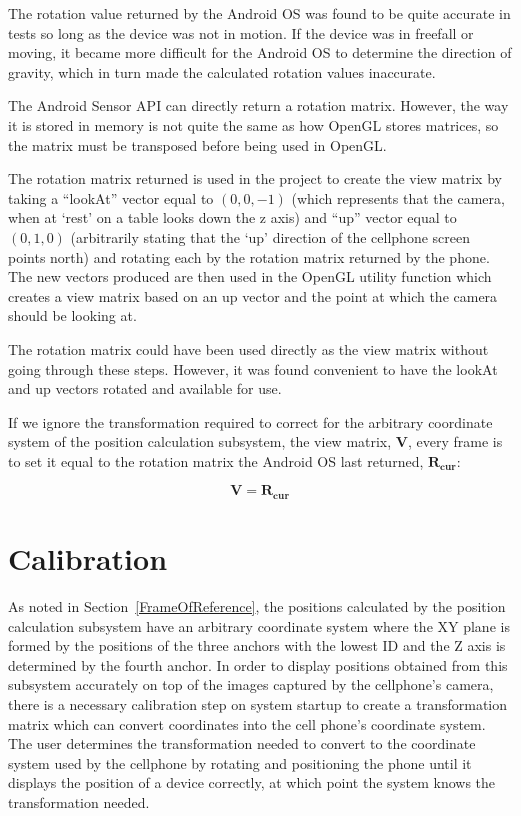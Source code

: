 The rotation value returned by the Android OS was found to be quite accurate in tests so long as the device was not in motion. If the device was in freefall or moving, it became more difficult for the Android OS to determine the direction of gravity, which in turn made the calculated rotation values inaccurate.

The Android Sensor API can directly return a rotation matrix. However, the way it is stored in memory is not quite the same as how OpenGL stores matrices, so the matrix must be transposed before being used in OpenGL.

The rotation matrix returned is used in the project to create the view matrix by taking a ``lookAt'' vector equal to $(0, 0, -1)$ (which represents that the camera, when at `rest' on a table looks down the z axis) and ``up'' vector equal to $(0, 1, 0)$ (arbitrarily stating that the `up' direction of the cellphone screen points north) and rotating each by the rotation matrix returned by the phone. The new vectors produced are then used in the OpenGL utility function  which creates a view matrix based on an up vector and the point at which the camera should be looking at.

The rotation matrix could have been used directly as the view matrix without going through these steps. However, it was found convenient to have the lookAt and up vectors rotated and available for use. 

If we ignore the transformation required to correct for the arbitrary coordinate system of the position calculation subsystem, the view matrix, $\mathbf{V}$, every frame is to set it equal to the rotation matrix the Android OS last returned, $\mathbf{R_{cur}}$:

\[
	\mathbf{V} = \mathbf{R_{cur}}
\]

\section{Calibration}
\label{Calibration}
As noted in Section~\ref{FrameOfReference}, the positions calculated by the position calculation subsystem have an arbitrary coordinate system where the XY plane is formed by the positions of the three anchors with the lowest ID and the Z axis is determined by the fourth anchor. In order to display positions obtained from this subsystem accurately on top of the images captured by the cellphone's camera, there is a necessary calibration step on system startup to create a transformation matrix which can convert coordinates into the cell phone's coordinate system. The user determines the transformation needed to convert to the coordinate system used by the cellphone by rotating and positioning the phone until it displays the position of a device correctly, at which point the system knows the transformation needed.

